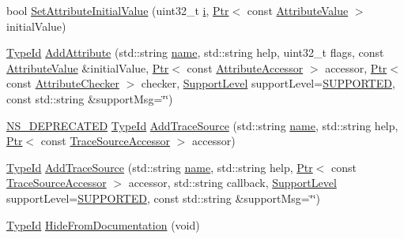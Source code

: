 \begin{DoxyCompactItemize}
\item 
bool \hyperlink{classns3_1_1TypeId_af477878663278dad47c764229490314b}{Set\+Attribute\+Initial\+Value} (uint32\+\_\+t \hyperlink{lte__uplink__power__control_8m_a6f6ccfcf58b31cb6412107d9d5281426}{i}, \hyperlink{classns3_1_1Ptr}{Ptr}$<$ const \hyperlink{classns3_1_1AttributeValue}{Attribute\+Value} $>$ initial\+Value)
\item 
\hyperlink{classns3_1_1TypeId}{Type\+Id} \hyperlink{classns3_1_1TypeId_a4550c3122527be876a3c634c3c8da960}{Add\+Attribute} (std\+::string \hyperlink{generate__test__data__lte__spectrum__model_8m_ab74e6bf80237ddc4109968cedc58c151}{name}, std\+::string help, uint32\+\_\+t flags, const \hyperlink{classns3_1_1AttributeValue}{Attribute\+Value} \&initial\+Value, \hyperlink{classns3_1_1Ptr}{Ptr}$<$ const \hyperlink{classns3_1_1AttributeAccessor}{Attribute\+Accessor} $>$ accessor, \hyperlink{classns3_1_1Ptr}{Ptr}$<$ const \hyperlink{classns3_1_1AttributeChecker}{Attribute\+Checker} $>$ checker, \hyperlink{classns3_1_1TypeId_ad55d31e57490a83a3ededa096a8d2588}{Support\+Level} support\+Level=\hyperlink{classns3_1_1TypeId_ad55d31e57490a83a3ededa096a8d2588a3eb3cddc13c7c70f1ab58e15babdda11}{S\+U\+P\+P\+O\+R\+T\+ED}, const std\+::string \&support\+Msg=\char`\"{}\char`\"{})
\item 
\hyperlink{deprecated_8h_a771fbc06c05c32655c757f56492d98c5}{N\+S\+\_\+\+D\+E\+P\+R\+E\+C\+A\+T\+ED} \hyperlink{classns3_1_1TypeId}{Type\+Id} \hyperlink{classns3_1_1TypeId_a9d55f3e144cb0a986e9ad7a433e5e541}{Add\+Trace\+Source} (std\+::string \hyperlink{generate__test__data__lte__spectrum__model_8m_ab74e6bf80237ddc4109968cedc58c151}{name}, std\+::string help, \hyperlink{classns3_1_1Ptr}{Ptr}$<$ const \hyperlink{classns3_1_1TraceSourceAccessor}{Trace\+Source\+Accessor} $>$ accessor)
\item 
\hyperlink{classns3_1_1TypeId}{Type\+Id} \hyperlink{classns3_1_1TypeId_a2aaf2918009ddd0ca687b55b91f7a9b2}{Add\+Trace\+Source} (std\+::string \hyperlink{generate__test__data__lte__spectrum__model_8m_ab74e6bf80237ddc4109968cedc58c151}{name}, std\+::string help, \hyperlink{classns3_1_1Ptr}{Ptr}$<$ const \hyperlink{classns3_1_1TraceSourceAccessor}{Trace\+Source\+Accessor} $>$ accessor, std\+::string callback, \hyperlink{classns3_1_1TypeId_ad55d31e57490a83a3ededa096a8d2588}{Support\+Level} support\+Level=\hyperlink{classns3_1_1TypeId_ad55d31e57490a83a3ededa096a8d2588a3eb3cddc13c7c70f1ab58e15babdda11}{S\+U\+P\+P\+O\+R\+T\+ED}, const std\+::string \&support\+Msg=\char`\"{}\char`\"{})
\item 
\hyperlink{classns3_1_1TypeId}{Type\+Id} \hyperlink{classns3_1_1TypeId_aa77c94c80d8c942a0da0db2de637fc14}{Hide\+From\+Documentation} (void)

\end{DoxyCompactItemize}
